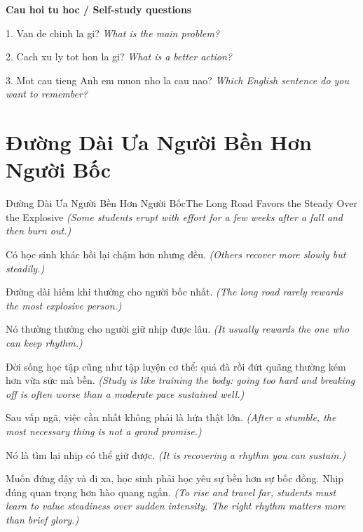 \begin{tuhocnhanh}
\textbf{Cau hoi tu hoc / Self-study questions}

1. Van de chinh la gi? \textit{What is the main problem?}

2. Cach xu ly tot hon la gi? \textit{What is a better action?}

3. Mot cau tieng Anh em muon nho la cau nao? \textit{Which English sentence do you want to remember?}
\end{tuhocnhanh}
\ngancach

\section{Đường Dài Ưa Người Bền Hơn Người Bốc}
\begin{truyen}{Đường Dài Ưa Người Bền Hơn Người Bốc}{The Long Road Favors the Steady Over the Explosive}
\textit{(Some students erupt with effort for a few weeks after a fall and then burn out.)}

Có học sinh khác hồi lại chậm hơn nhưng đều.
\textit{(Others recover more slowly but steadily.)}

Đường dài hiếm khi thưởng cho người bốc nhất.
\textit{(The long road rarely rewards the most explosive person.)}

Nó thường thưởng cho người giữ nhịp được lâu.
\textit{(It usually rewards the one who can keep rhythm.)}

Đời sống học tập cũng như tập luyện cơ thể: quá đà rồi đứt quãng thường kém hơn vừa sức mà bền.
\textit{(Study is like training the body: going too hard and breaking off is often worse than a moderate pace sustained well.)}

Sau vấp ngã, việc cần nhất không phải là hứa thật lớn.
\textit{(After a stumble, the most necessary thing is not a grand promise.)}

Nó là tìm lại nhịp có thể giữ được.
\textit{(It is recovering a rhythm you can sustain.)}

\end{truyen}

\begin{baihoc}
Muốn đứng dậy và đi xa, học sinh phải học yêu sự bền hơn sự bốc đồng. Nhịp đúng quan trọng hơn hào quang ngắn.
\textit{(To rise and travel far, students must learn to value steadiness over sudden intensity. The right rhythm matters more than brief glory.)}
\end{baihoc}

